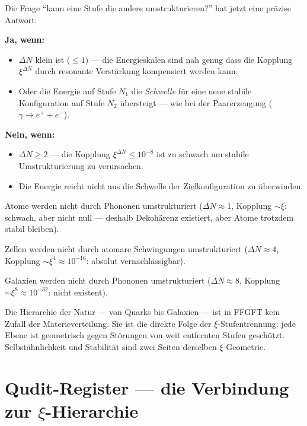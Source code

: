 Die Frage ``kann eine Stufe die andere umstrukturieren?''
hat jetzt eine präzise Antwort:

\textbf{Ja, wenn:}
\begin{itemize}
  \item $\Delta N$ klein ist ($\leq 1$) --- die Energieskalen
    sind nah genug dass die Kopplung $\xi^{\Delta N}$
    durch resonante Verstärkung kompensiert werden kann.
  \item Oder die Energie auf Stufe $N_1$ die
    \emph{Schwelle} für eine neue stabile Konfiguration
    auf Stufe $N_2$ übersteigt ---
    wie bei der Paarerzeugung ($\gamma \to e^+ + e^-$).
\end{itemize}

\textbf{Nein, wenn:}
\begin{itemize}
  \item $\Delta N \geq 2$ --- die Kopplung
    $\xi^{\Delta N} \leq 10^{-8}$ ist zu schwach
    um stabile Umstrukturierung zu verursachen.
  \item Die Energie reicht nicht aus die Schwelle
    der Zielkonfiguration zu überwinden.
\end{itemize}

\begin{keypoint}
Atome werden nicht durch Phononen umstrukturiert
($\Delta N \approx 1$, Kopplung $\sim \xi$: schwach,
aber nicht null --- deshalb Dekohärenz existiert,
aber Atome trotzdem stabil bleiben).

Zellen werden nicht durch atomare Schwingungen
umstrukturiert ($\Delta N \approx 4$,
Kopplung $\sim \xi^4 \approx 10^{-16}$:
absolut vernachlässigbar).

Galaxien werden nicht durch Phononen umstrukturiert
($\Delta N \approx 8$,
Kopplung $\sim \xi^8 \approx 10^{-32}$:
nicht existent).

Die Hierarchie der Natur --- von Quarks bis Galaxien ---
ist in FFGFT kein Zufall der Materieverteilung.
Sie ist die direkte Folge der $\xi$-Stufentrennung:
jede Ebene ist geometrisch gegen Störungen
von weit entfernten Stufen geschützt.
Selbstähnlichkeit und Stabilität sind
zwei Seiten derselben $\xi$-Geometrie.
\end{keypoint}


\section{Qudit-Register --- die Verbindung zur \texorpdfstring{$\xi$}{xi}-Hierarchie}
\label{sec:qudit-register}

